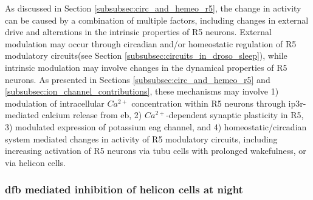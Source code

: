 \documentclass[../main.tex]{subfiles}
\begin{document}
As discussed in Section \ref{subsubsec:circ_and_hemeo_r5}, the change in activity can be caused by a combination of multiple factors, including changes in external drive and alterations in the intrinsic properties of R5 neurons. External modulation may occur through circadian and/or homeostatic regulation of R5 modulatory circuits(see Section \ref{subsubsec:circuits_in_droso_sleep}), while intrinsic modulation may involve changes in the dynamical properties of R5 neurons. As presented in Sections \ref{subsubsec:circ_and_hemeo_r5} and \ref{subsubsec:ion_channel_contributions}, these mechanisms may involve 1) modulation of intracellular $Ca^{2+}$ concentration within R5 neurons through \gls{ip3r}-mediated calcium release from \gls{eb}, 2) $Ca^{2+}$-dependent synaptic plasticity in R5, 3) modulated expression of potassium \gls{eag} channel, and 4) homeostatic/circadian system mediated changes in activity of R5 modulatory circuits, including increasing activation of R5 neurons via \gls{tubu} cells with prolonged wakefulness, or via helicon cells.



\subsubsection{\texorpdfstring{\acrshort{dfb}}{dFB} mediated inhibition of helicon cells at night}
\end{document}
